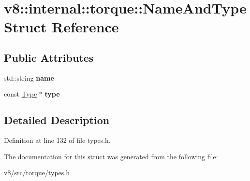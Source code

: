 \hypertarget{structv8_1_1internal_1_1torque_1_1NameAndType}{}\section{v8\+:\+:internal\+:\+:torque\+:\+:Name\+And\+Type Struct Reference}
\label{structv8_1_1internal_1_1torque_1_1NameAndType}
\subsection*{Public Attributes}
\begin{DoxyCompactItemize}
\item 
\mbox{\label{structv8_1_1internal_1_1torque_1_1NameAndType_ab4164c1d13148c7345f2ef87b6003203}} 
std\+::string {\bfseries name}
\item 
\mbox{\label{structv8_1_1internal_1_1torque_1_1NameAndType_a54ac879c0ea6c68d1e153af12dcdc8e3}} 
const \mbox{\hyperlink{classv8_1_1internal_1_1torque_1_1Type}{Type}} $\ast$ {\bfseries type}
\end{DoxyCompactItemize}


\subsection{Detailed Description}


Definition at line 132 of file types.\+h.



The documentation for this struct was generated from the following file\+:\begin{DoxyCompactItemize}
\item 
v8/src/torque/types.\+h\end{DoxyCompactItemize}
